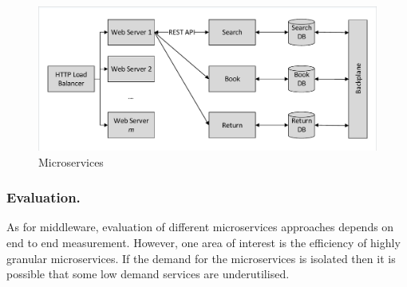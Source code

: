 \begin{figure}
\caption{Microservices}
\centering
\includegraphics[trim = 5 5 5 5, clip, width=\textwidth]{img/microservices}
\end{figure}

\subsubsection{Evaluation.}
As for middleware, evaluation of different microservices approaches depends on end to end measurement.   However, one area of interest is the efficiency of highly granular microservices.  If the demand for the microservices is isolated then it is possible that some low demand services are underutilised.
